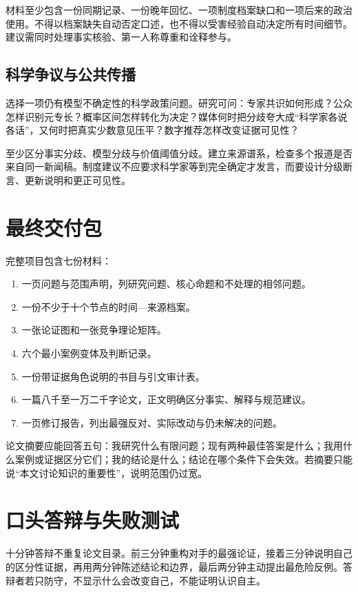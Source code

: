 材料至少包含一份同期记录、一份晚年回忆、一项制度档案缺口和一项后来的政治使用。不得以档案缺失自动否定口述，也不得以受害经验自动决定所有时间细节。建议需同时处理事实核验、第一人称尊重和诠释参与。

\subsection{科学争议与公共传播}

选择一项仍有模型不确定性的科学政策问题。研究可问：专家共识如何形成？公众怎样识别元专长？概率区间怎样转化为决定？媒体何时把分歧夸大成“科学家各说各话”，又何时把真实少数意见压平？数字推荐怎样改变证据可见性？

至少区分事实分歧、模型分歧与价值阈值分歧。建立来源谱系，检查多个报道是否来自同一新闻稿。制度建议不应要求科学家等到完全确定才发言，而要设计分级断言、更新说明和更正可见性。

\section{最终交付包}

完整项目包含七份材料：

\begin{enumerate}
\item 一页问题与范围声明，列研究问题、核心命题和不处理的相邻问题。
\item 一份不少于十个节点的时间—来源档案。
\item 一张论证图和一张竞争理论矩阵。
\item 六个最小案例变体及判断记录。
\item 一份带证据角色说明的书目与引文审计表。
\item 一篇八千至一万二千字论文，正文明确区分事实、解释与规范建议。
\item 一页修订报告，列出最强反对、实际改动与仍未解决的问题。
\end{enumerate}

论文摘要应能回答五句：我研究什么有限问题；现有两种最佳答案是什么；我用什么案例或证据区分它们；我的结论是什么；结论在哪个条件下会失效。若摘要只能说“本文讨论知识的重要性”，说明范围仍过宽。

\section{口头答辩与失败测试}

十分钟答辩不重复论文目录。前三分钟重构对手的最强论证，接着三分钟说明自己的区分性证据，再用两分钟陈述结论和边界，最后两分钟主动提出最危险反例。答辩者若只防守，不显示什么会改变自己，不能证明认识自主。

